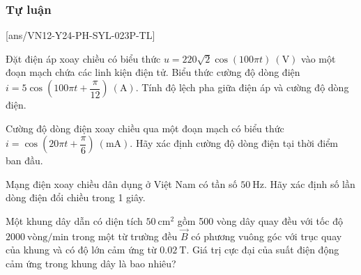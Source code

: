 \subsubsection{Tự luận}
\setcounter{ex}{0}
[ans/VN12-Y24-PH-SYL-023P-TL]
\begin{ex}
	Đặt điện áp xoay chiều có biểu thức $u=220\sqrt{2}\cos\left(100\pi t\right)\ \left(\si{\volt}\right)$ vào một đoạn mạch chứa các linh kiện điện tử. Biểu thức cường độ dòng điện $i=5\cos\left(100\pi t+\dfrac{\pi}{12}\right)\ \left(\si{\ampere}\right)$. Tính độ lệch pha giữa điện áp và cường độ dòng điện.
\end{ex}
\begin{ex}
	Cường độ dòng điện xoay chiều qua một đoạn mạch có biểu thức $i=\cos\left(20\pi t+\dfrac{\pi}{6}\right)\ \left(\si{\milli\ampere}\right)$. Hãy xác định cường độ dòng điện tại thời điểm ban đầu.
\end{ex}
\begin{ex}
	Mạng điện xoay chiều dân dụng ở Việt Nam có tần số $\SI{50}{\hertz}$. Hãy xác định số lần dòng điện đổi chiều trong 1 giây.
\end{ex}
\begin{ex}
	Một khung dây dẫn có diện tích $\SI{50}{\centi\meter^2}$ gồm 500 vòng dây quay đều với tốc độ $\SI{2000}{\text{vòng}/\minute}$ trong một từ trường đều $\vec{B}$ có phương vuông góc với trục quay của khung và có độ lớn cảm ứng từ $\SI{0.02}{\tesla}$. Giá trị cực đại của suất điện động cảm ứng trong khung dây là bao nhiêu?
\end{ex}

